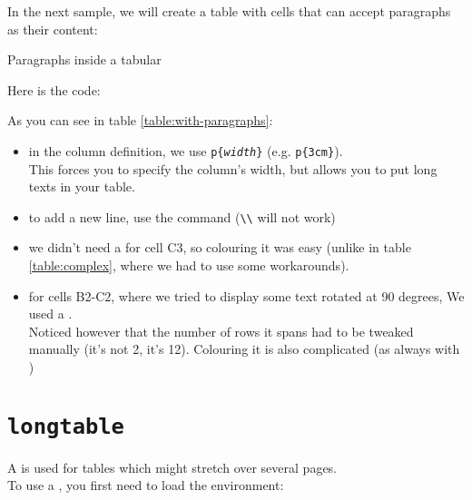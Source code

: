 In the next sample, we will create a table with cells that can accept paragraphs as their content:

\begin{table}[h]
	\caption{Paragraphs inside a tabular}
	\label{table:with-paragraphs}
	\centering
	
\end{table}


Here is the code:


\bigskip

As you can see in table \ref{table:with-paragraphs}:

\begin{itemize}
	\item in the column definition, we use \texttt{p\{\textit{width}\}} (e.g. \texttt{p\{3cm\}}). \\
	This forces you to specify the column's width, but allows you to put long texts in your table. 
	
	\item to add a new line, use the  command (\lstinline|\\| will not work)
	
	\item we didn't need a  for cell C3, so colouring it was easy (unlike in table \ref{table:complex}, where we had to use some workarounds).
	
	\item for cells B2-C2, where we tried to display some text rotated at 90 degrees, We used a . \\
	Noticed however that the number of rows it spans had to be tweaked manually (it's not 2, it's 12). Colouring it is also complicated (as always with )
\end{itemize}


\section{\texttt{longtable}}

A  is used for tables which might stretch over several pages. \\

To use a , you first need to load the  environment:


